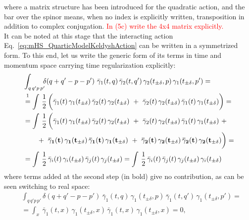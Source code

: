 \documentclass[a4paper,11pt, english]{article}
\theoremstyle{remark}
\newcommand{\nline}{\\[0.3cm]}
\begin{document}
where a matrix structure has been introduced for the quadratic action, and the bar over the spinor means, when no index is explicitly written, transposition in addition to complex conjugation. \textcolor{red}{In (5c) write the 4x4 matrix explicitly.}\nline
It can be noted at this stage that the interacting action Eq.~\eqref{eq:mHS_QuarticModelKeldyshAction} can be written in a symmetrized form. To this end, let us write the generic form of its terms in time and momentum space carrying time regularization explicitly:
\begin{align}
 &\int_{q\,q'p\,p'}\!\!\!\delta(q+q'-p-p')\  \bar{\gamma}_{1}(t,q)\,\bar{\gamma}_{2}(t,q')\,\gamma_{2}(t_{\pm\delta},p)\,\gamma_{1}(t_{\pm\delta},p') =\notag\\
 &\overset{\footnotemark}{=}\int\,\frac{1}{2}\,\bigg( \bar{\gamma}_{1}(t)\,\gamma_{1}(t_{\pm\delta})\,\bar{\gamma}_{2}(t)\,\gamma_{2}(t_{\pm\delta})\ +\ \bar{\gamma}_{2}(t)\,\gamma_{2}(t_{\pm\delta})\,\bar{\gamma}_{1}(t)\,\gamma_{1}(t_{\pm\delta})     \bigg) = \notag \\
 &= \int\,\frac{1}{2}\,\bigg( \bar{\gamma}_{1}(t)\,\gamma_{1}(t_{\pm\delta})\,\bar{\gamma}_{2}(t)\,\gamma_{2}(t_{\pm\delta})\ +\ \bar{\gamma}_{2}(t)\,\gamma_{2}(t_{\pm\delta})\,\bar{\gamma}_{1}(t)\,\gamma_{1}(t_{\pm\delta})\ + \notag\\ &\ \ \ \ \ \ +\ \mathbf{\bar{\gamma}_{1}(t)\,\gamma_{1}(t_{\pm\delta})\,\bar{\gamma}_{1}(t)\,\gamma_{1}(t_{\pm\delta}) \ +\ \bar{\gamma}_{2}(t)\,\gamma_{2}(t_{\pm\delta})\,\bar{\gamma}_{2}(t)\,\gamma_{2}(t_{\pm\delta})}   \bigg)= \notag\\ 
 &=\int\, \frac{1}{2}\, \bar{\gamma}_{i}(t)\,\gamma_{i}(t_{\pm\delta})\,\bar{\gamma}_{j}(t)\,\gamma_{j}(t_{\pm\delta}) = \int\,\frac{1}{2}\,\bar{\gamma}_{i}(t)\,\bar{\gamma}_{j}(t)\,\gamma_{j}(t_{\pm\delta})\,\gamma_{i}(t_{\pm\delta}) \label{eq:mHS_QuarticModelKeldyshAction_Symmetrized}
\end{align}
 where terms added at the second step (in bold) give no contribution, as can be seen switching to real space:
 \begin{equation}
  \begin{split}
   &\int_{q\,q'p\,p'}\!\!\!\delta(q+q'-p-p')\  \bar{\gamma}_{1}(t,q)\,\gamma_{1}(t_{\pm\delta},p)\,\bar{\gamma}_{1}(t,q')\,\gamma_{1}(t_{\pm\delta},p') =  \\
  &=\int_x\ \bar{\gamma}_{1}(t,x)\,\gamma_{1}(t_{\pm\delta},x)\,\bar{\gamma}_{1}(t,x)\,\gamma_{1}(t_{\pm\delta},x)=0,
  \end{split} 
  \label{eq:mHS_zerotermsadded}
 \end{equation}
\end{document}
